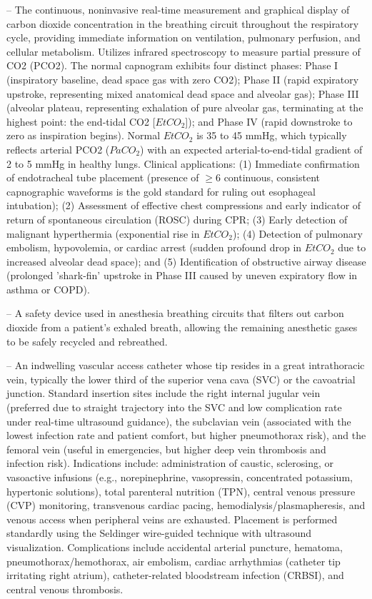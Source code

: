 -- The continuous, noninvasive real-time measurement and graphical display of carbon dioxide concentration in the breathing circuit throughout the respiratory cycle, providing immediate information on ventilation, pulmonary perfusion, and cellular metabolism. Utilizes infrared spectroscopy to measure partial pressure of CO2 (PCO2). The normal capnogram exhibits four distinct phases: Phase I (inspiratory baseline, dead space gas with zero CO2); Phase II (rapid expiratory upstroke, representing mixed anatomical dead space and alveolar gas); Phase III (alveolar plateau, representing exhalation of pure alveolar gas, terminating at the highest point: the end-tidal CO2 [$EtCO_2$]); and Phase IV (rapid downstroke to zero as inspiration begins). Normal $EtCO_2$ is 35 to 45 mmHg, which typically reflects arterial PCO2 ($PaCO_2$) with an expected arterial-to-end-tidal gradient of 2 to 5 mmHg in healthy lungs. Clinical applications: (1) Immediate confirmation of endotracheal tube placement (presence of $\ge 6$ continuous, consistent capnographic waveforms is the gold standard for ruling out esophageal intubation); (2) Assessment of effective chest compressions and early indicator of return of spontaneous circulation (ROSC) during CPR; (3) Early detection of malignant hyperthermia (exponential rise in $EtCO_2$); (4) Detection of pulmonary embolism, hypovolemia, or cardiac arrest (sudden profound drop in $EtCO_2$ due to increased alveolar dead space); and (5) Identification of obstructive airway disease (prolonged 'shark-fin' upstroke in Phase III caused by uneven expiratory flow in asthma or COPD).

-- A safety device used in anesthesia breathing circuits that filters out carbon dioxide from a patient's exhaled breath, allowing the remaining anesthetic gases to be safely recycled and rebreathed.

-- An indwelling vascular access catheter whose tip resides in a great intrathoracic vein, typically the lower third of the superior vena cava (SVC) or the cavoatrial junction. Standard insertion sites include the right internal jugular vein (preferred due to straight trajectory into the SVC and low complication rate under real-time ultrasound guidance), the subclavian vein (associated with the lowest infection rate and patient comfort, but higher pneumothorax risk), and the femoral vein (useful in emergencies, but higher deep vein thrombosis and infection risk). Indications include: administration of caustic, sclerosing, or vasoactive infusions (e.g., norepinephrine, vasopressin, concentrated potassium, hypertonic solutions), total parenteral nutrition (TPN), central venous pressure (CVP) monitoring, transvenous cardiac pacing, hemodialysis/plasmapheresis, and venous access when peripheral veins are exhausted. Placement is performed standardly using the Seldinger wire-guided technique with ultrasound visualization. Complications include accidental arterial puncture, hematoma, pneumothorax/hemothorax, air embolism, cardiac arrhythmias (catheter tip irritating right atrium), catheter-related bloodstream infection (CRBSI), and central venous thrombosis.

